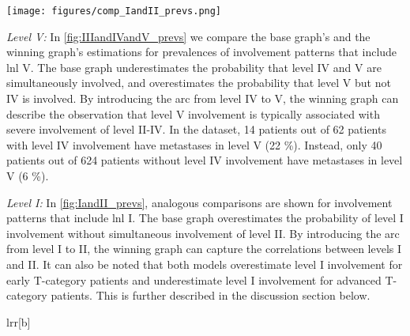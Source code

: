 \documentclass[twocolumn]{aastex631}
\begin{document}
\begin{figure*}
    \begin{centering}
        \texttt{[image: figures/comp\_IandII\_prevs.png]}
        \caption{Comparison of observed and predicted prevalences of \gls{lnl} I and II involvement patterns. The top and bottom panels show the prevalences for early and advanced T-category, respectively. The solid lines are Beta posteriors from the data, while the histograms are predicted prevalences (colored: winning graph, gray-hatched: base graph). Blue and red plots indicate overall \gls{lnl} I and II involvement, respectively. Green plots indicate \gls{lnl} I involvement without level II, while orange plots indicate the opposite (\gls{lnl} II without level I). The winning graph has an added edge from \gls{lnl} I to II, which improves the prediction of the rare green pattern. \label{fig:IandII_prevs}}
    \end{centering}
\end{figure*}

{\it Level V:} In \autoref{fig:IIIandIVandV_prevs} we compare the base graph's and the winning graph's estimations for prevalences of involvement patterns that include \gls{lnl} V. The base graph underestimates the probability that level IV and V are simultaneously involved, and overestimates the probability that level V but not IV is involved. By introducing the arc from level IV to V, the winning graph can describe the observation that level V involvement is typically associated with severe involvement of level II-IV. In the dataset, 14 patients out of 62 patients with level IV involvement have metastases in level V (22 \%). Instead, only 40 patients out of 624 patients without level IV involvement have metastases in level V (6 \%).

{\it Level I:} In \autoref{fig:IandII_prevs}, analogous comparisons are shown for involvement patterns that include \gls{lnl} I. The base graph overestimates the probability of level I involvement without simultaneous involvement of level II. By introducing the arc from level I to II, the winning graph can capture the correlations between levels I and II. It can also be noted that both models overestimate level I involvement for early T-category patients and underestimate level I involvement for advanced T-category patients. This is further described in the discussion section below.

\begin{deluxetable}{lrr}[b]
    \startdata
    \enddata
\end{deluxetable}
\end{document}
